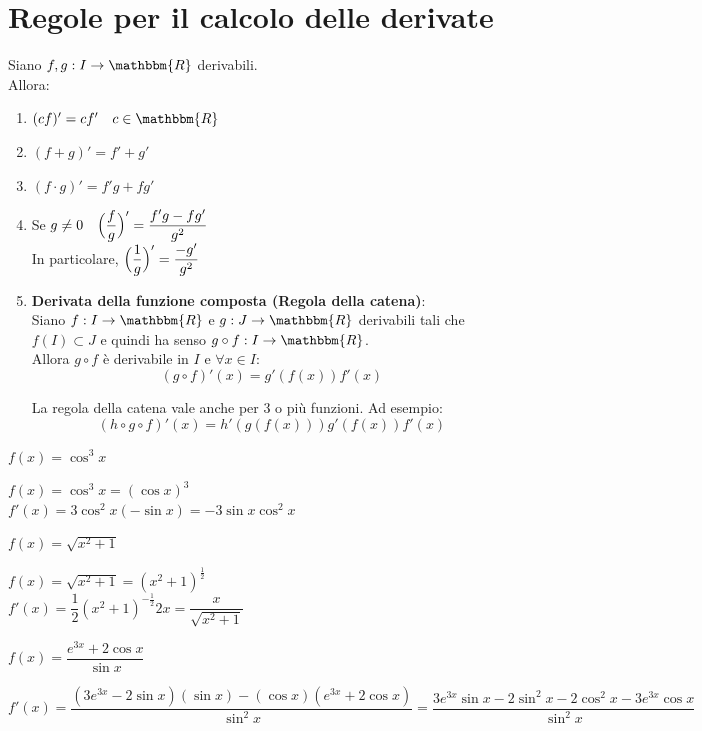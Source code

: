 \documentclass[12pt]{report}
\newcounter{exercise}
\begin{document}
 	\section{Regole per il calcolo delle derivate}
 	Siano $f, g: I \to \mathbbm{R}$ derivabili.\\
 	Allora:
 	\begin{enumerate}[label = (\arabic*)]
 		\item $(cf)' = cf' \quad c \in \mathbbm{R}$
 		\item $(f + g)'= f'+g'$
 		\item $(f \cdot g)' = f'g + fg'$
 		\item Se $g \neq 0\quad \Bigl(\dfrac{f}{g}\Bigr)' = \dfrac{f'g - fg'}{g^2}$ \\
 		In particolare, $\Bigl(\dfrac{1}{g}\Bigr)'=  \dfrac{-g'}{g^2}$
 		\item \textbf{Derivata della funzione composta (Regola della catena)}: \\
 		Siano $f: I \to \mathbbm{R}$ e $g: J \to \mathbbm{R}$ derivabili tali che $f(I) \subset J$ e quindi ha senso $g \circ f: I \to \mathbbm{R}$. \\
 		Allora $g \circ f$ è derivabile in $I$ e $\forall x \in I$:
 		\[
 		(g \circ f)'(x) = g'(f(x))f'(x)
 		\]
 		\begin{note}{}{}
 			La regola della catena vale anche per 3 o più funzioni. Ad esempio:
 			\[
 			(h \circ g \circ f)'(x) = h'(g(f(x)))g'(f(x))f'(x)
 			\]
 		\end{note}
 	\end{enumerate}
 	\begin{assignment}{}{}
 		$f(x) = \cos^3x$
 		\begin{exercise}{}{}
 			$f(x) =\cos^3x=(\cos x)^3$ \\
 			$f'(x) = 3\cos^2x(-\sin x) = -3\sin x \cos^2x$
 		\end{exercise}
 	\end{assignment}
 	\begin{assignment}{}{}
 		$f(x) = \sqrt{x^2 + 1}$
 		\begin{exercise}{}{}
 			$f(x) =\sqrt{x^2 + 1}=(x^2 + 1)^{\frac{1}{2}}$ \\
 			$f'(x) = \dfrac{1}{2}(x^2 + 1)^{-\frac{1}{2}}2x = \dfrac{x}{\sqrt{x^2 + 1}}$
 		\end{exercise}
 	\end{assignment}
 	\begin{assignment}{}{}
 		$f(x) = \dfrac{e^{3x} + 2\cos x}{\sin x}$
 		\begin{exercise}{}{}
 			$f'(x) = \dfrac{(3e^{3x} - 2\sin x)(\sin x) - (\cos x)(e^{3x} + 2\cos x)}{\sin^2x} = \dfrac{3e^{3x}\sin x - 2\sin^2x - 2\cos^2x - 3e^{3x}\cos x}{\sin^2x}$
 		\end{exercise}
 	\end{assignment}
\end{document}

